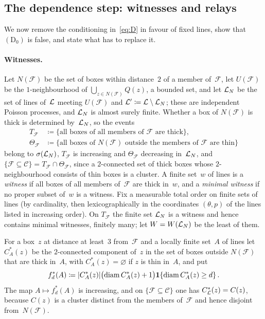 \documentclass[11pt,letterpaper]{article}
\DeclareMathOperator{\diam}{diam}
\begin{document}
\subsection{The dependence step: witnesses and relays}
\label{sec:witness}

We now remove the conditioning in~\eqref{eq:D} in favour of fixed lines, show that $\mathrm{(D_0)}$ is false, and state what has to replace it.

\paragraph{Witnesses.} Let $N(\mathcal F)$ be the set of boxes within distance~$2$ of a member of~$\mathcal F$, let $U(\mathcal F)$ be the $1$-neighbourhood of $\bigcup_{z\in N(\mathcal F)}Q(z)$, a bounded set, and let $\mathcal L_N$ be the set of lines of~$\mathcal L$ meeting $U(\mathcal F)$ and $\mathcal L'\coloneqq\mathcal L\setminus\mathcal L_N$; these are independent Poisson processes, and $\mathcal L_N$ is almost surely finite. Whether a box of $N(\mathcal F)$ is thick is determined by~$\mathcal L_N$, so the events
\begin{align*}
  T_{\mathcal F}&\coloneqq\{\text{all boxes of all members of }\mathcal F\text{ are thick}\},\\
  \Theta_{\mathcal F}&\coloneqq\{\text{all boxes of }N(\mathcal F)\text{ outside the members of }\mathcal F\text{ are thin}\}
\end{align*}
belong to $\sigma(\mathcal L_N)$, $T_{\mathcal F}$ is increasing and $\Theta_{\mathcal F}$ decreasing in~$\mathcal L_N$, and $\{\mathcal F\subseteq\mathcal C\}=T_{\mathcal F}\cap\Theta_{\mathcal F}$, since a $2$-connected set of thick boxes whose $2$-neighbourhood consists of thin boxes is a cluster. A finite set~$w$ of lines is a \emph{witness} if all boxes of all members of~$\mathcal F$ are thick in~$w$, and a \emph{minimal witness} if no proper subset of~$w$ is a witness. Fix a measurable total order on finite sets of lines (by cardinality, then lexicographically in the coordinates $(\theta,p)$ of the lines listed in increasing order). On $T_{\mathcal F}$ the finite set $\mathcal L_N$ is a witness and hence contains minimal witnesses, finitely many; let $W=W(\mathcal L_N)$ be the least of them.

For a box~$z$ at distance at least~$3$ from~$\mathcal F$ and a locally finite set~$A$ of lines let $C^*_A(z)$ be the $2$-connected component of~$z$ in the set of boxes outside $N(\mathcal F)$ that are thick in~$A$, with $C^*_A(z)=\varnothing$ if $z$ is thin in~$A$, and put
\begin{equation}
\label{eq:fstar}
  f^*_d(A)\coloneqq\lvert C^*_A(z)\rvert\bigl(\diam C^*_A(z)+1\bigr)\1\{\diam C^*_A(z)\ge d\}\,.
\end{equation}
The map $A\mapsto f^*_d(A)$ is increasing, and on $\{\mathcal F\subseteq\mathcal C\}$ one has $C^*_{\mathcal L}(z)=C(z)$, because $C(z)$ is a cluster distinct from the members of~$\mathcal F$ and hence disjoint from~$N(\mathcal F)$.
\end{document}
